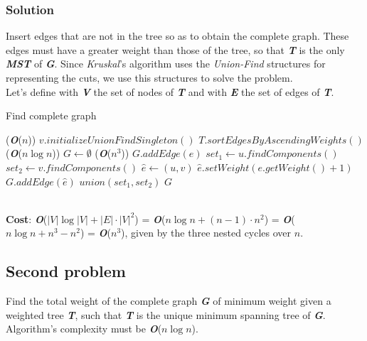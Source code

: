\documentclass[11pt]{article}
\begin{document}
\subsubsection*{Solution}
Insert edges that are not in the tree so as to obtain the complete graph. These edges must have a greater weight than those of the tree, so that \textbf{\textit{T}} is the only \textbf{\textit{MST}} of \textbf{\textit{G}}. Since \textit{Kruskal}'s algorithm uses the \textit{Union-Find} structures for representing the cuts, we use this structures to solve the problem. \\
Let's define with \textbf{\textit{V}} the set of nodes of \textbf{\textit{T}} and with \textbf{\textit{E}} the set of edges of \textbf{\textit{T}}.
\begin{algorithm}
	\caption{Find complete graph}\label{euclid}
	\begin{algorithmic}[1]
		 \qquad \qquad \qquad \qquad \qquad \qquad \qquad \qquad \qquad \qquad \qquad \qquad (\textbf{\textit{O}}($n$))
			\State $v.initializeUnionFindSingleton()$
		\EndFor
		\State $T.sortEdgesByAscendingWeights()$ \qquad \qquad \qquad \qquad \qquad \qquad \qquad (\textbf{\textit{O}}($n\log{n}$))
		\State $G \gets \emptyset$
		 \qquad \qquad \qquad \qquad \qquad \qquad \qquad \qquad \qquad \qquad (\textbf{\textit{O}}($n^3$))
			\State  $G.addEdge(e)$
			\State  $set_1 \gets u.findComponents()$
			\State  $set_2 \gets v.findComponents()$
					\State $\hat{e} \gets (u, v)$
						\State $\hat{e}.setWeight(e.getWeight() + 1)$
						\State $G.addEdge(\hat{e})$
					\EndIf
				\EndFor
			\EndFor
			\State $union(set_1, set_2)$
		\EndFor
		\State \Return $G$
	\end{algorithmic}
\end{algorithm} \\
\textbf{Cost}: \textbf{\textit{O}}($|V|\log{|V|} + |E| \cdot |V|^2$) = \textbf{\textit{O}}($n\log{n} + (n-1) \cdot n^2$) = \textbf{\textit{O}}($n\log{n} + n^3 - n^2$) = \textbf{\textit{O}}($n^3$), given by the three nested cycles over $n$.
\subsection*{Second problem}
Find the total weight of the complete graph \textbf{\textit{G}} of minimum weight given a weighted tree \textbf{\textit{T}}, such that  \textbf{\textit{T}} is the unique minimum spanning tree of \textbf{\textit{G}}. Algorithm's complexity must be \textbf{\textit{O}}($n \log{n}$).
\end{document}
